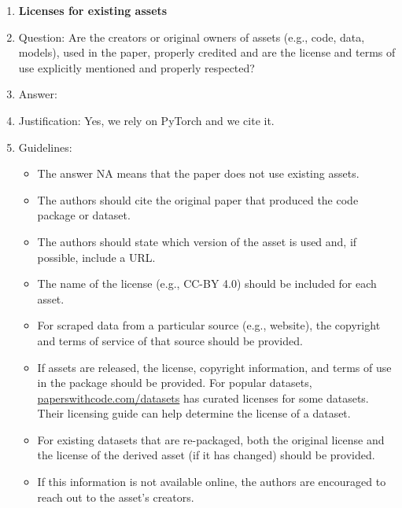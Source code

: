 \documentclass{article} %
\newcounter{ct}
\theoremstyle{definition}
\theoremstyle{remark}
\begin{document}
\begin{enumerate}
\item {\bf Licenses for existing assets}
    \item[] Question: Are the creators or original owners of assets (e.g., code, data, models), used in the paper, properly credited and are the license and terms of use explicitly mentioned and properly respected?
    \item[] Answer: \answerYes{} %
    \item[] Justification: Yes, we rely on PyTorch and we cite it.
    \item[] Guidelines:
    \begin{itemize}
        \item The answer NA means that the paper does not use existing assets.
        \item The authors should cite the original paper that produced the code package or dataset.
        \item The authors should state which version of the asset is used and, if possible, include a URL.
        \item The name of the license (e.g., CC-BY 4.0) should be included for each asset.
        \item For scraped data from a particular source (e.g., website), the copyright and terms of service of that source should be provided.
        \item If assets are released, the license, copyright information, and terms of use in the package should be provided. For popular datasets, \url{paperswithcode.com/datasets} has curated licenses for some datasets. Their licensing guide can help determine the license of a dataset.
        \item For existing datasets that are re-packaged, both the original license and the license of the derived asset (if it has changed) should be provided.
        \item If this information is not available online, the authors are encouraged to reach out to the asset's creators.
    \end{itemize}


\end{enumerate}
\end{document}
